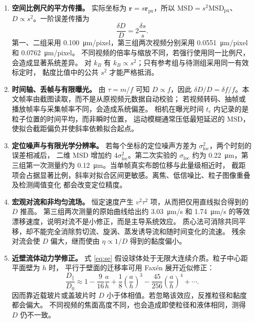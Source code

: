 \documentclass[11pt]{article}
\begin{document}
\begin{enumerate}
    \item \textbf{空间比例尺的平方传播。}
    实际坐标为 $\bm r=s\bm r_{\mathrm{px}}$，所以
    $\mathrm{MSD}=s^2\mathrm{MSD}_{\mathrm{px}}$、$D\propto s^2$。一阶误差传播为
    \begin{equation}
        \frac{\delta D}{D}=2\frac{\delta s}{s}.
    \end{equation}
    第一、二组采用 \SI{0.100}{\micro m/pixel}，第三组两次视频分别采用
    \SI{0.0551}{\micro m/pixel} 和 \SI{0.0762}{\micro m/pixel}。
    不同视频的倍率与缩放不同，若强行使用同一比例尺，会造成显著系统差异。
    对 $k_B$ 有 $k_B\propto s^2$；只有参考组与待测组采用同一有效标定时，
    黏度比值中的公共 $s^2$ 才能严格抵消。

    \item \textbf{时间轴、丢帧与有限曝光。}
    由 $\tau=m/f$ 可知 $D\propto f$，因此
    $\delta D/D=\delta f/f$。本文帧率由截图读取，而不是从原视频元数据自动校验；
    若视频转码、抽帧或播放帧率与采集帧率不同，会造成系统偏差。
    相机在曝光时间 $t_e$ 内记录的是粒子位置的时间平均，而非瞬时位置，
    运动模糊通常压低最短延迟的 MSD，使拟合截距偏负并使斜率依赖拟合起点。

    \item \textbf{定位噪声与有限光学分辨率。}
    若每个坐标的定位噪声方差为 $\sigma_{\mathrm{loc}}^2$，两个时刻的误差相减后，
    二维 MSD 增加约 $4\sigma_{\mathrm{loc}}^2$。第二次实验的
    $\sigma_{\mathrm{loc}}$ 约为 \SI{0.22}{\micro m}，第三组第一次测量约为
    \SI{0.12}{\micro m}。当单帧真实布朗位移与此量级相近时，
    截距项会占据显著比例，斜率对拟合区间更敏感。离焦、低信噪比、粒子图像重叠及检测阈值变化
    都会改变定位精度。

    \item \textbf{宏观对流和非均匀流场。}
    恒定速度产生 $v^2\tau^2$ 项，从而把仅用直线拟合得到的 $D$ 推高。
    第三组两次测量的原始曲线给出约 \SI{3.03}{\micro m/s} 和
    \SI{1.74}{\micro m/s} 的等效漂移速度，说明对流不是小修正，而是主导系统效应。
    质心法可消除共同平移，却不能完全消除剪切流、旋涡、蒸发诱导流和随时间变化的流速。
    残余对流会使 $D$ 偏大，继而使由 $\eta\propto1/D$ 得到的黏度偏小。

    \item \textbf{近壁流体动力学修正。}
    式 \eqref{eq:se} 假设球体处于无限大连续介质。粒子中心距平面壁为 $h$ 时，
    平行于壁面的迁移率可用 Faxén 展开近似修正：
    \begin{equation}
        \frac{D_{\parallel}}{D_0}
        \approx1-\frac{9}{16}\frac{a}{h}
        +\frac{1}{8}\left(\frac{a}{h}\right)^3
        -\frac{45}{256}\left(\frac{a}{h}\right)^4+\cdots .
    \end{equation}
    因而靠近载玻片或盖玻片时 $D$ 小于体相值。若忽略该效应，反推粒径和黏度都会偏大。
    不同视频的焦面高度不同，也会造成即使粒径和液体相同，测得 $D$ 仍不一致。


\end{enumerate}
\end{document}
